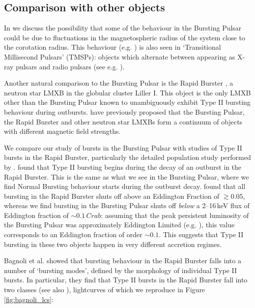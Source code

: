 \subsection{Comparison with other objects}

\par In \citet{Court_BPTMSP} we discuss the possibility that some of the behaviour in the Bursting Pulsar could be due to fluctuations in the magnetospheric radius of the system close to the corotation radius.  This behaviour (e.g. \citealp{Bogdanov_TMSPVar,Ferrigno_TMSPVar}) is also seen in `Transitional Millisecond Pulsars' (TMSPs): objects which alternate between appearing as X-ray pulsars and radio pulsars (see e.g. \citealp{Archibald_Link,Papitto_Swings}).
\par Another natural comparison to the Bursting Pulsar is the Rapid Burster \citep{Lewin_RBDiscovery}, a neutron star LMXB in the globular cluster Liller I.  This object is the only LMXB other than the Bursting Pulsar known to unambiguously exhibit Type II bursting behaviour during outbursts.  \citet{Rappaport_BPHistory} have previously proposed that the Bursting Pulsar, the Rapid Burster and other neutron star LMXBs form a continuum of objects with different magnetic field strengths.
\par We compare our study of bursts in the Bursting Pulsar with studies of Type II bursts in the Rapid Burster, particularly the detailed population study performed by \citet{Bagnoli_PopStudy}.  \citet{Bagnoli_PopStudy} found that Type II bursting begins during the decay of an outburst in the Rapid Burster.  This is the same as what we see in the Bursting Pulsar, where we find Normal Bursting behaviour starts during the outburst decay.  \citet{Bagnoli_PopStudy} found that all bursting in the Rapid Burster shuts off above an Eddington Fraction of $\gtrsim0.05$, whereas we find bursting in the Bursting Pulsar shuts off \textit{below} a 2--16\,keV flux of Eddington fraction of $\sim0.1\,Crab$: assuming that the peak persistent luminosity of the Bursting Pulsar was approximately Eddington Limited (e.g. \citealp{Sazonov_BPGranat}), this value corresponds to an Eddington fraction of order $\sim0.1$.  This suggests that Type II bursting in these two objects happen in very different accretion regimes.
\par Bagnoli et al. showed that bursting behaviour in the Rapid Burster falls into a number of `bursting modes', defined by the morphology of individual Type II bursts.  In particular, they find that Type II bursts in the Rapid Burster fall into two classes (see also \citealp{Marshall_2types}), lightcurves of which we reproduce in Figure \ref{fig:bagnoli_lcs}:

